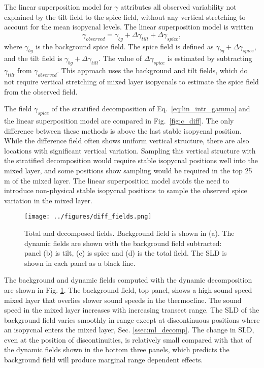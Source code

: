 \documentclass[preprint,NumberedRefs]{JASA}
\begin{document}
The linear superposition model for $\gamma$ attributes all observed variability not explained by the tilt field to the spice field, without any vertical stretching to account for the mean isopycnal levels. The linear superposition model is written
\begin{equation}
    \gamma_{observed} = \gamma_{bg} + \Delta \gamma_{tilt} + \Delta \gamma_{spice},
    \label{eq:lin_sup}
\end{equation}
where $\gamma_{bg}$ is the background spice field. The spice field is defined as $\gamma_{bg} + \Delta \gamma_{spice}$, and the tilt field is $\gamma_{bg} + \Delta \gamma_{tilt}$. The value of $\Delta \gamma_{spice}$ is estimated by subtracting $\gamma_{tilt}$ from $\gamma_{observed}$. This approach uses the background and tilt fields, which do not require vertical stretching of mixed layer isopycnals to estimate the spice field from the observed field.

The field $\gamma_{spice}$ of the stratified decomposition of Eq.~\eqref{eq:lin_intr_gamma} and the linear superposition model are compared in Fig.~\ref{fig:c_diff}. The only difference between these methods is above the last stable isopycnal position. While the difference field often shows uniform vertical structure, there are also locations with significant vertical variation. Sampling this vertical structure with the stratified decomposition would require stable isopycnal positions well into the mixed layer, and some positions show sampling would be required in the top 25 m of the mixed layer. The linear superposition model avoids the need to introduce non-physical stable isopycnal positions to sample the observed spice variation in the mixed layer.

\begin{figure}
\texttt{[image: ../figures/diff\_fields.png]}
        \caption{\label{fig:c_fields}{Total and decomposed fields. Background field is shown in (a). The dynamic fields are shown with the background field subtracted: panel (b) is tilt, (c) is spice and (d) is the total field. The SLD is shown in each panel as a black line.}}
\end{figure}

The background and dynamic fields computed with the dynamic decomposition are shown in Fig. \ref{fig:c_fields}. The background field, top panel, shows a high sound speed mixed layer that overlies slower sound speeds in the thermocline. The sound speed in the mixed layer increases with increasing transect range. The SLD of the background field varies smoothly in range except at discontinuous positions where an isopycnal enters the mixed layer, Sec. \ref{ssec:ml_decomp}. The change in SLD, even at the position of discontinuities, is relatively small compared with that of the dynamic fields shown in the bottom three panels, which predicts the background field will produce marginal range dependent effects.
\end{document}
